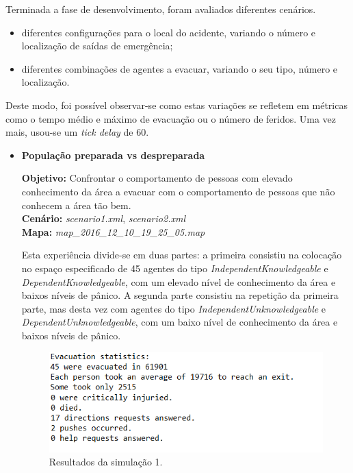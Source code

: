 \documentclass[12pt]{article}
\begin{document}
\begin{titlepage}
\begin{itemize}
\end{itemize}


Terminada a fase de desenvolvimento, foram avaliados diferentes cenários.
\begin{itemize}
	\item diferentes configurações para o local do acidente, variando o número e localização de saídas de emergência;
	\item diferentes combinações de agentes a evacuar, variando o seu tipo, número e localização.
\end{itemize}

Deste modo, foi possível observar-se como estas variações se refletem em métricas como o tempo médio e máximo de evacuação ou o número de feridos. Uma vez mais, usou-se um \textit{tick delay} de 60.

\begin{itemize}
	\item \textbf{População preparada vs despreparada}

\textbf{Objetivo:} 
Confrontar o comportamento de pessoas com elevado conhecimento da área a evacuar com o comportamento de pessoas que não conhecem a área tão bem.
\\\textbf{Cenário:} 
\textit{scenario1.xml}, \textit{scenario2.xml}
\\\textbf{Mapa:} 
\textit{map\_2016\_12\_10\_19\_25\_05.map}
\newline


Esta experiência divide-se em duas partes: a primeira consistiu na colocação no espaço especificado de 45 agentes do tipo \textit{IndependentKnowledgeable} e \textit{DependentKnowledgeable}, com um elevado nível de conhecimento da área e baixos níveis de pânico. A segunda parte consistiu na repetição da primeira parte, mas desta vez com agentes do tipo \textit{IndependentUnknowledgeable} e \textit{DependentUnknowledgeable}, com um baixo nível de conhecimento da área e  baixos níveis de pânico.

\begin{figure}[H]
	\centering
	\includegraphics{log_sc1.png}
	\caption{Resultados da simulação 1.}
	\label{log_sc1}
\end{figure}


\end{itemize}
\end{titlepage}
\end{document}
